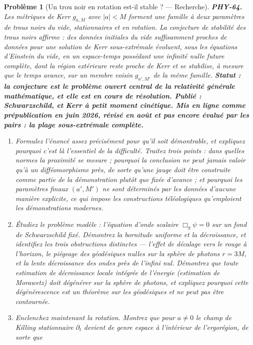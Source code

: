 \documentclass[11pt]{article}
\newtheorem{problem}{Problème}
\begin{document}
\begin{problem}[{Un trou noir en rotation est-il stable ? --- Recherche}]
\textbf{PHY-64.} Les métriques de Kerr $ g_{a,M} $ avec $ |a| < M $ forment une famille à
deux paramètres de trous noirs du vide, stationnaires et en rotation. La conjecture de stabilité
des trous noirs affirme : des données initiales du vide suffisamment proches de données pour une
solution de Kerr sous-extrémale évoluent, sous les équations d'Einstein du vide, en un
espace-temps possédant une infinité nulle future complète, dont la région extérieure reste proche
de Kerr et se stabilise, à mesure que le temps avance, sur un membre voisin $ g_{a',M'} $ de la
même famille. \textbf{Statut : la conjecture est le problème ouvert central de la relativité générale
mathématique, et elle est en cours de résolution. Publié : Schwarzschild, et Kerr à petit moment
cinétique. Mis en ligne comme prépublication en juin 2026, révisé en août et pas encore évalué par
les pairs : la plage sous-extrémale complète.}
\begin{enumerate}
\item[(a)] Formulez l'énoncé assez précisément pour qu'il soit démontrable, et expliquez pourquoi c'est là
l'essentiel de la difficulté. Traitez trois points : dans quelles normes la \og{} proximité \fg{} se
mesure ; pourquoi la conclusion ne peut jamais valoir qu'à un difféomorphisme près, de sorte
qu'une jauge doit être construite comme partie de la démonstration plutôt que fixée d'avance ; et
pourquoi les paramètres finaux $ (a', M') $ ne sont déterminés par les données d'aucune manière
explicite, ce qui impose les constructions \og{} téléologiques \fg{} qu'emploient les démonstrations
modernes.
\item[(b)] Étudiez le problème modèle : l'équation d'onde scalaire $ \Box_{g}\psi = 0 $ sur un fond de
Schwarzschild fixé. Démontrez la bornitude uniforme et la décroissance, et identifiez les trois
obstructions distinctes --- l'effet de décalage vers le rouge à l'horizon, le piégeage des géodésiques
nulles sur la sphère de photons $ r = 3M $, et la lente décroissance des ondes près de l'infini
nul. Démontrez que toute estimation de décroissance locale intégrée de l'énergie (estimation de
Morawetz) doit dégénérer sur la sphère de photons, et expliquez pourquoi cette dégénérescence est
un théorème sur les géodésiques et ne peut pas être contournée.
\item[(c)] Enclenchez maintenant la rotation. Montrez que pour $ a \neq 0 $ le champ de Killing
stationnaire $ \partial_{t} $ devient de genre espace à l'intérieur de l'ergorégion, de sorte que

\end{enumerate}
\end{problem}
\end{document}
